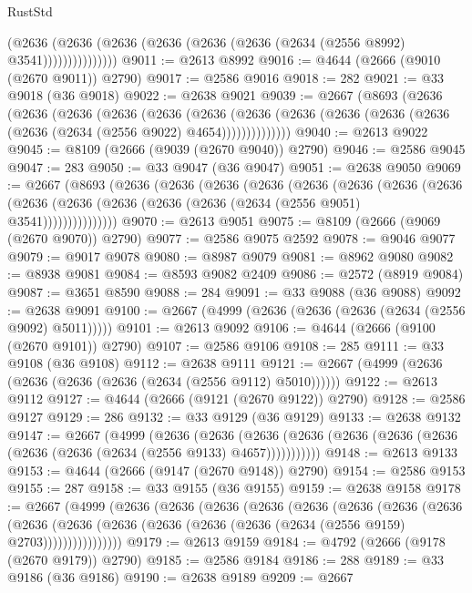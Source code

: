 \begin{lexlean}{RustStd}
\begin{coremodule}
                    (@2636
                      (@2636 (@2636 (@2636 (@2636 (@2636 (@2634 (@2556 @8992) @3541)))))))))))))))
@9011 := @2613 @8992
@9016 := @4644 (@2666 (@9010 (@2670 @9011)) @2790)
@9017 := @2586 @9016
@9018 := 282
@9021 := @33 @9018 (@36 @9018)
@9022 := @2638 @9021
@9039 := @2667
    (@8693
      (@2636
        (@2636
          (@2636
            (@2636
              (@2636
                (@2636
                  (@2636 (@2636 (@2636 (@2636 (@2636 (@2636 (@2634 (@2556 @9022) @4654))))))))))))))
@9040 := @2613 @9022
@9045 := @8109 (@2666 (@9039 (@2670 @9040)) @2790)
@9046 := @2586 @9045
@9047 := 283
@9050 := @33 @9047 (@36 @9047)
@9051 := @2638 @9050
@9069 := @2667
    (@8693
      (@2636
        (@2636
          (@2636
            (@2636
              (@2636
                (@2636
                  (@2636
                    (@2636
                      (@2636 (@2636 (@2636 (@2636 (@2636 (@2634 (@2556 @9051) @3541)))))))))))))))
@9070 := @2613 @9051
@9075 := @8109 (@2666 (@9069 (@2670 @9070)) @2790)
@9077 := @2586 @9075 @2592
@9078 := @9046 @9077
@9079 := @9017 @9078
@9080 := @8987 @9079
@9081 := @8962 @9080
@9082 := @8938 @9081
@9084 := @8593 @9082 @2409
@9086 := @2572 (@8919 @9084)
@9087 := @3651 @8590
@9088 := 284
@9091 := @33 @9088 (@36 @9088)
@9092 := @2638 @9091
@9100 := @2667 (@4999 (@2636 (@2636 (@2636 (@2634 (@2556 @9092) @5011)))))
@9101 := @2613 @9092
@9106 := @4644 (@2666 (@9100 (@2670 @9101)) @2790)
@9107 := @2586 @9106
@9108 := 285
@9111 := @33 @9108 (@36 @9108)
@9112 := @2638 @9111
@9121 := @2667 (@4999 (@2636 (@2636 (@2636 (@2636 (@2634 (@2556 @9112) @5010))))))
@9122 := @2613 @9112
@9127 := @4644 (@2666 (@9121 (@2670 @9122)) @2790)
@9128 := @2586 @9127
@9129 := 286
@9132 := @33 @9129 (@36 @9129)
@9133 := @2638 @9132
@9147 := @2667
    (@4999
      (@2636
        (@2636
          (@2636 (@2636 (@2636 (@2636 (@2636 (@2636 (@2636 (@2634 (@2556 @9133) @4657)))))))))))
@9148 := @2613 @9133
@9153 := @4644 (@2666 (@9147 (@2670 @9148)) @2790)
@9154 := @2586 @9153
@9155 := 287
@9158 := @33 @9155 (@36 @9155)
@9159 := @2638 @9158
@9178 := @2667
    (@4999
      (@2636
        (@2636
          (@2636
            (@2636
              (@2636
                (@2636
                  (@2636
                    (@2636
                      (@2636
                        (@2636
                          (@2636 (@2636 (@2636 (@2636 (@2634 (@2556 @9159) @2703))))))))))))))))
@9179 := @2613 @9159
@9184 := @4792 (@2666 (@9178 (@2670 @9179)) @2790)
@9185 := @2586 @9184
@9186 := 288
@9189 := @33 @9186 (@36 @9186)
@9190 := @2638 @9189
@9209 := @2667

\end{coremodule}
\end{lexlean}
